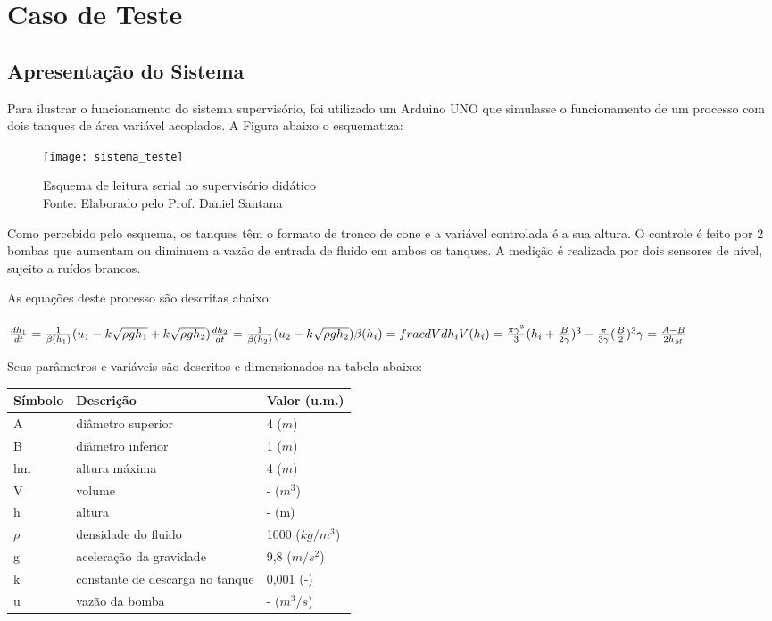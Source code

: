 \chapter{Caso de Teste}

\section{Apresentação do Sistema}

Para ilustrar o funcionamento do sistema supervisório, foi utilizado um Arduino UNO que simulasse o funcionamento de um processo com dois tanques de área variável acoplados. A Figura abaixo o esquematiza:

\begin{figure}
	\centering
	\texttt{[image: sistema\_teste]}
	\caption{Esquema de leitura serial no supervisório didático\\Fonte: Elaborado pelo Prof. Daniel Santana}
	\label{img_sistema_teste}
\end{figure}

Como percebido pelo esquema, os tanques têm o formato de tronco de cone e a variável controlada é a sua altura. O controle é feito por 2 bombas que aumentam ou diminuem a vazão de entrada de fluido em ambos os tanques. A medição é realizada por dois sensores de nível, sujeito a ruídos brancos.

As equações deste processo são descritas abaixo:
\\\\
$
\frac{dh_1}{dt} = \frac{1}{\beta(h_1)}(u_1 - k\sqrt{\rho g h_1} + k\sqrt{\rho g h_2})\\
\frac{dh_2}{dt} = \frac{1}{\beta(h_2)}(u_2 - k\sqrt{\rho g h_2})\\
\beta(h_i) = frac{dV}{dh_i}\\
V(h_i) = \frac{\pi\gamma^2}{3}(h_i + \frac{B}{2\gamma})^3 - \frac{\pi}{3\gamma}(\frac{B}{2})^3\\
\gamma = \frac{A-B}{2h_M}\\
$

Seus parâmetros e variáveis são descritos e dimensionados na tabela abaixo:

\begin{center}
	\begin{tabular} {|m{5em}|m{15em}|m{8em}|}
		\hline
		Símbolo & Descrição & Valor (u.m.) \\
		\hline
		A & diâmetro superior & 4 ($m$) \\
		B & diâmetro inferior & 1 ($m$) \\
		hm & altura máxima & 4 ($m$) \\
		V & volume & - ($m^3$) \\
		h & altura & - (m) \\
		$\rho$ & densidade do fluido & 1000 ($kg/m^3$) \\
		g & aceleração da gravidade & 9,8 ($m/s^2$) \\
		k & constante de descarga no tanque & 0,001 (-)\\
		u & vazão da bomba & - ($m^3/s$)\\
		\hline
	\end{tabular}
\end{center}

